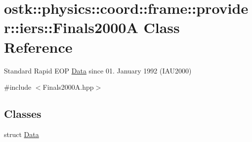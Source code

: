 \hypertarget{classostk_1_1physics_1_1coord_1_1frame_1_1provider_1_1iers_1_1_finals2000_a}{}\section{ostk\+:\+:physics\+:\+:coord\+:\+:frame\+:\+:provider\+:\+:iers\+:\+:Finals2000A Class Reference}
\label{classostk_1_1physics_1_1coord_1_1frame_1_1provider_1_1iers_1_1_finals2000_a}


Standard Rapid E\+OP \hyperlink{structostk_1_1physics_1_1coord_1_1frame_1_1provider_1_1iers_1_1_finals2000_a_1_1_data}{Data} since 01. January 1992 (I\+A\+U2000)  




{\ttfamily \#include $<$Finals2000\+A.\+hpp$>$}

\subsection*{Classes}
\begin{DoxyCompactItemize}
\item 
struct \hyperlink{structostk_1_1physics_1_1coord_1_1frame_1_1provider_1_1iers_1_1_finals2000_a_1_1_data}{Data}
\end{DoxyCompactItemize}
